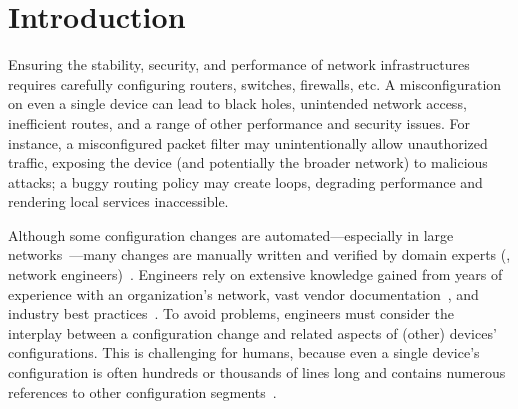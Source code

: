 
\section{Introduction}
\label{sec:intro}

Ensuring the stability, security, and performance of network infrastructures %
requires carefully configuring routers, switches, firewalls, etc. A misconfiguration on even a single device can lead to black holes, unintended network access, inefficient routes, and a range of other performance and security issues. For instance, a misconfigured packet filter may unintentionally allow unauthorized traffic, exposing the device (and potentially the broader network) to malicious attacks; a buggy routing policy may create loops, degrading performance and rendering local services inaccessible.

Although some configuration changes are automated---especially in large networks~\cite{tian2019jinjing, ramanathan2023aura, mahimkar2022aurora, rasche2023esnet}---many changes are manually written and verified by domain experts (\ie, network engineers)~\cite{abhashkumar2020aed}. Engineers rely on extensive 
knowledge gained from years of experience with an organization's network, vast vendor documentation~\cite{ciscosupport, junosdocumentation}, and industry best practices~\cite{manrs}. To avoid problems, engineers must consider the interplay between a configuration change and related aspects of (other) devices' configurations.
This is challenging for humans, because even a single device's configuration is often hundreds or thousands of lines long and contains numerous references to other configuration segments~\cite{benson2009complexitymetrics}.


